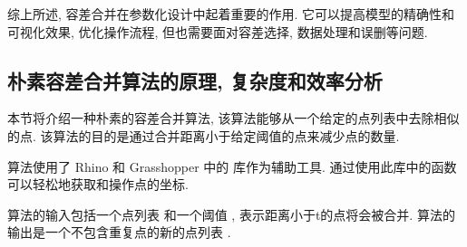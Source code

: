 综上所述, 容差合并在参数化设计中起着重要的作用.
它可以提高模型的精确性和可视化效果, 优化操作流程, 但也需要面对容差选择, 数据处理和误删等问题.

\subsection{朴素容差合并算法的原理, 复杂度和效率分析}










本节将介绍一种朴素的容差合并算法, 该算法能够从一个给定的点列表中去除相似的点.
该算法的目的是通过合并距离小于给定阈值的点来减少点的数量.


算法使用了 Rhino 和 Grasshopper 中的  库作为辅助工具.
通过使用此库中的函数可以轻松地获取和操作点的坐标.

算法的输入包括一个点列表  和一个阈值 , 表示距离小于t的点将会被合并.
算法的输出是一个不包含重复点的新的点列表 .

